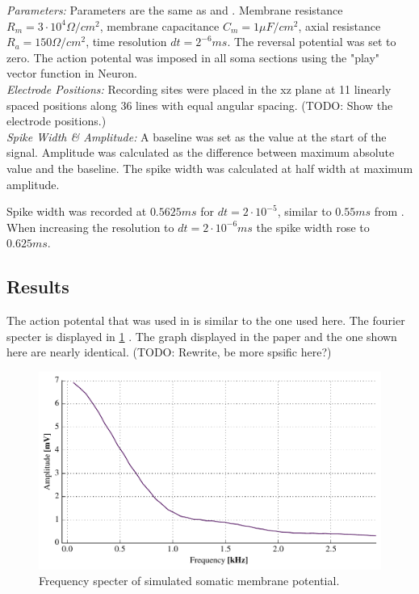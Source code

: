 \documentclass[altfont, fleqn]{uiophd}
\let\mycref\cref
\renewcommand{\cref}[1]{{\color{viridis_03}\mycref{#1}} }
\begin{document}
\noindent\emph{Parameters:}
Parameters are the same as \textcite{pettersen_amplitude_2008} and 
\textcite{dayan_theoretical_2001} . Membrane resistance 
$R_m = 3\cdot10^4\Omega /cm^2$, membrane capacitance $C_m=1\mu F / cm^2$, 
axial resistance $R_a = 150\Omega/cm^2$, time resolution $dt=2^{-6}ms$. 
The reversal potential was set to zero. The action potental was imposed in all
soma sections using the "play" vector function in Neuron.
\\

\noindent\emph{Electrode Positions:}
Recording sites were placed in the xz plane at 11 linearly spaced 
positions along 36 lines with equal 
angular spacing. (TODO: Show the electrode positions.) 
\\


\noindent\emph{Spike Width \& Amplitude:}
A baseline was set as the value at the start of the signal. 
Amplitude was calculated as the difference between maximum absolute value and the
baseline.
The spike width was calculated at half width at maximum amplitude. 

Spike width was recorded at $0.5625 ms$ for $dt=2\cdot10^{-5}$, similar to 
$0.55ms$ from \textcite{pettersen_amplitude_2008}. When increasing the
resolution to $dt=2\cdot10^{-6}ms$ the spike width rose to $0.625ms$. 


\subsection{Results}
The action potental that was used in \textcite{pettersen_amplitude_2008} 
is similar to the one used here.  The fourier specter is displayed in
\cref{fig:3_1_fourier}. The graph displayed in the paper and 
the one shown here are nearly identical. 
(TODO: Rewrite, be more spsific here?) \\

\begin{figure}[thp]
\centering
\includegraphics[width=\textwidth]{images/3_methods/3_1_reproduction/soma_mem_fourier.pdf}
\caption{Frequency specter of simulated somatic membrane potential.}
\label{fig:3_1_fourier}
\end{figure}
\end{document}
